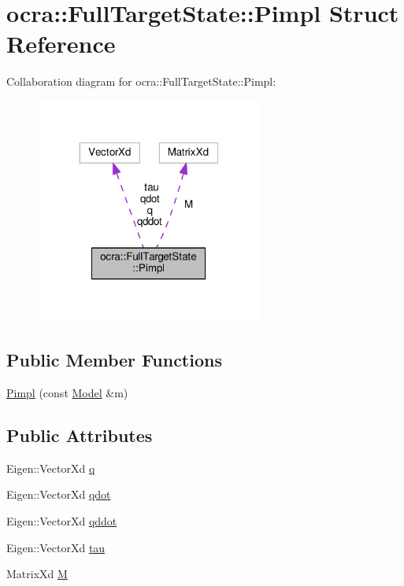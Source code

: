 \hypertarget{structocra_1_1FullTargetState_1_1Pimpl}{}\section{ocra\+:\+:Full\+Target\+State\+:\+:Pimpl Struct Reference}
\label{structocra_1_1FullTargetState_1_1Pimpl}


Collaboration diagram for ocra\+:\+:Full\+Target\+State\+:\+:Pimpl\+:
\nopagebreak
\begin{figure}[H]
\begin{center}
\leavevmode
\includegraphics[width=212pt]{d2/dac/structocra_1_1FullTargetState_1_1Pimpl__coll__graph}
\end{center}
\end{figure}
\subsection*{Public Member Functions}
\begin{DoxyCompactItemize}
\item 
\hyperlink{structocra_1_1FullTargetState_1_1Pimpl_abf41bdded179528f89726ae9071f1377}{Pimpl} (const \hyperlink{classocra_1_1Model}{Model} \&m)
\end{DoxyCompactItemize}
\subsection*{Public Attributes}
\begin{DoxyCompactItemize}
\item 
Eigen\+::\+Vector\+Xd \hyperlink{structocra_1_1FullTargetState_1_1Pimpl_afb9abfe35480d2dea95ed9d54e8906df}{q}
\item 
Eigen\+::\+Vector\+Xd \hyperlink{structocra_1_1FullTargetState_1_1Pimpl_a2d1307a89fa37ddb50305785e7d91e68}{qdot}
\item 
Eigen\+::\+Vector\+Xd \hyperlink{structocra_1_1FullTargetState_1_1Pimpl_a6eb86dcb00ed58935f11c42f030645a3}{qddot}
\item 
Eigen\+::\+Vector\+Xd \hyperlink{structocra_1_1FullTargetState_1_1Pimpl_aae33a52895f1ead1be869d88b3e6ff9f}{tau}
\item 
Matrix\+Xd \hyperlink{structocra_1_1FullTargetState_1_1Pimpl_aaf42a0f7ecf1e3750695edc06fb06c11}{M}
\end{DoxyCompactItemize}


